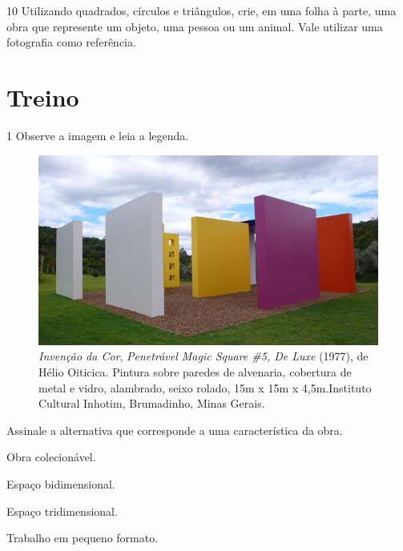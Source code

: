 
\num{10} Utilizando quadrados, círculos e triângulos, crie, em uma folha à parte,
uma obra que represente um objeto, uma pessoa ou um animal. Vale utilizar uma fotografia como referência.


\pagebreak
\section{Treino}

\num{1} Observe a imagem e leia a legenda.

\begin{figure}[htpb!]
\includegraphics[width=\textwidth]{./imgs/art9.png}
\caption{\emph{Invenção da Cor}, \emph{Penetrável Magic Square \#5, De Luxe} (1977), de Hélio Oiticica. Pintura sobre paredes de alvenaria, cobertura de metal e vidro, alambrado, seixo rolado, 15m x 15m x 4,5m.Instituto Cultural Inhotim, Brumadinho, Minas Gerais.}
\end{figure}

Assinale a alternativa que corresponde a uma característica da obra.

\begin{minipage}{.5\textwidth}
\begin{escolha}
\item
  Obra colecionável.
\item
  Espaço bidimensional.
\item
  Espaço tridimensional.
\item
  Trabalho em pequeno formato.
\end{escolha}
\end{minipage}

